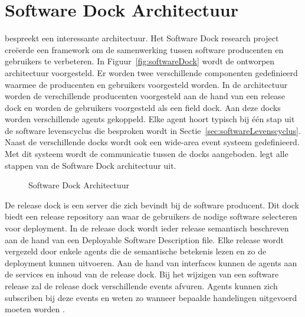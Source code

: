 \section{Software Dock Architectuur}\label{sec:softwareDock}
\citet{hall1999cooperative} bespreekt een interessante architectuur.
Het Software Dock research project creëerde een framework om de samenwerking tussen software producenten en gebruikers te verbeteren.
In Figuur~\vref{fig:softwareDock} wordt de ontworpen architectuur voorgesteld.
Er worden twee verschillende componenten gedefinieerd waarmee de producenten en gebruikers voorgesteld worden.
In de architectuur worden de verschillende producenten voorgesteld aan de hand van een release dock en worden de gebruikers voorgesteld als een field dock.
Aan deze docks worden verschillende agents gekoppeld.
Elke agent hoort typisch bij één stap uit de software levenscyclus die besproken wordt in Sectie~\vref{sec:softwareLevenscyclus}.
Naast de verschillende docks wordt ook een wide-area event systeem gedefinieerd.
Met dit systeem wordt de communicatie tussen de docks aangeboden.
\citet{hall1997architecture} legt alle stappen van de Software Dock architectuur uit.

\begin{figure}[!ht]
\centering
{}
\caption{Software Dock Architectuur \citep{hall1999cooperative}}
\label{fig:softwareDock}
\end{figure}

De release dock is een server die zich bevindt bij de software producent.
Dit dock biedt een release repository aan waar de gebruikers de nodige software selecteren voor deployment.
In de release dock wordt ieder release semantisch beschreven aan de hand van een Deployable Software Description file.
Elke release wordt vergezeld door enkele agents die de semantische betekenis lezen en zo de deployment kunnen uitvoeren.
Aan de hand van interfaces kunnen de agents aan de services en inhoud van de release dock.
Bij het wijzigen van een software release zal de release dock verschillende events afvuren.
Agents kunnen zich subscriben bij deze events en weten zo wanneer bepaalde handelingen uitgevoerd moeten worden \citep{hall1999cooperative}.

